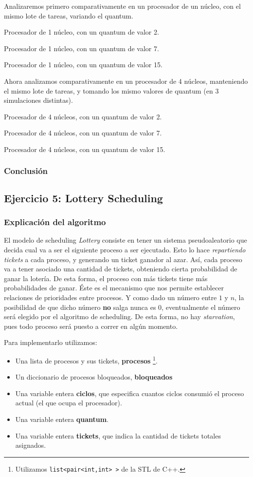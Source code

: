 \documentclass[a4paper]{article}
\begin{document}
Analizaremos primero comparativamente en un procesador de un núcleo, con el
mismo lote de tareas, variando el quantum.

Procesador de 1 núcleo, con un quantum de valor 2.

Procesador de 1 núcleo, con un quantum de valor 7.

Procesador de 1 núcleo, con un quantum de valor 15.

Ahora analizamos comparativamente en un procesador de 4 núcleos, manteniendo
el mismo lote de tareas, y tomando los mismo valores de quantum (en 3
simulaciones distintas).

Procesador de 4 núcleos, con un quantum de valor 2.

Procesador de 4 núcleos, con un quantum de valor 7.

Procesador de 4 núcleos, con un quantum de valor 15.

\subsubsection{Conclusión}

\subsection{Ejercicio 5: Lottery Scheduling}
\subsubsection{Explicación del algoritmo}
El modelo de scheduling \textit{Lottery} consiste en tener un sistema
pseudoaleatorio que decida cual va a ser el siguiente proceso a ser
ejecutado. Esto lo hace \textit{repartiendo tickets} a cada proceso, y
generando un ticket ganador al azar. Así, cada
proceso va a tener asociado una cantidad de tickets, obteniendo
cierta probabilidad de ganar la lotería. De esta forma, el proceso con más
tickets tiene más probabilidades de ganar. Éste es el mecanismo que nos
permite establecer relaciones de prioridades entre procesos.
Y como dado un número entre $1$ y $n$, la posibilidad de que dicho número
\textbf{no} salga nunca es $0$, eventualmente el número será elegido por el
algoritmo de scheduling. De esta forma, no hay \textit{starvation}, pues
todo proceso será puesto a correr en algún momento.

Para implementarlo utilizamos:
\begin{itemize}
\item Una lista de procesos y sus tickets, \textbf{procesos}
\footnote{Utilizamos \verb|list<pair<int,int> >| de la STL de C++.}.
\item Un diccionario de procesos bloqueados, \textbf{bloqueados}
\item Una variable entera \textbf{ciclos}, que especifica cuantos ciclos
consumió el proceso actual (el que ocupa el procesador).
\item Una variable entera \textbf{quantum}.
\item Una variable entera \textbf{tickets}, que indica la cantidad de
tickets totales asignados.
\end{itemize}
\end{document}
